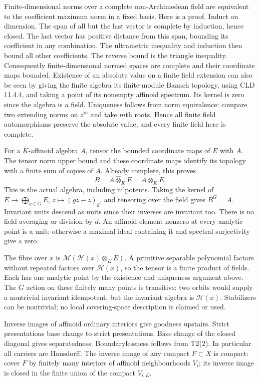 \documentclass[
  10pt,
]{article}
\begin{document}
Finite-dimensional norms over a complete non-Archimedean field are
equivalent to the coefficient maximum norm in a fixed basis. Here is a
proof. Induct on dimension. The span of all but the last vector is
complete by induction, hence closed. The last vector has positive
distance from this span, bounding its coefficient in any combination.
The ultrametric inequality and induction then bound all other
coefficients. The reverse bound is the triangle inequality. Consequently
finite-dimensional normed spaces are complete and their coordinate maps
bounded. Existence of an absolute value on a finite field extension can
also be seen by giving the finite algebra its finite-module Banach
topology, using CLD 11.4.4, and taking a point of its nonempty affinoid
spectrum. Its kernel is zero since the algebra is a field. Uniqueness
follows from norm equivalence: compare two extending norms on \(z^m\)
and take \(m\)th roots. Hence all finite field automorphisms preserve
the absolute value, and every finite field here is complete.

For a \(K\)-affinoid algebra \(A\), tensor the bounded coordinate maps
of \(E\) with \(A\). The tensor norm upper bound and these coordinate
maps identify its topology with a finite sum of copies of \(A\). Already
complete, this proves \[
             B=A\widehat\otimes_K E=A\otimes_K E.        \tag{5}
\] This is the actual algebra, including nilpotents. Taking the kernel
of \(E\to\bigoplus_{g\in G}E\), \(z\mapsto(gz-z)_g\), and tensoring over
the field gives \(B^G=A\). Invariant units descend as units since their
inverses are invariant too. There is no field averaging or division by
\(d\). An affinoid element nonzero at every analytic point is a unit:
otherwise a maximal ideal containing it and spectral surjectivity give a
zero.

The fibre over \(x\) is \(\mathcal M(\mathcal H(x)\otimes_K E)\). A
primitive separable polynomial factors without repeated factors over
\(\mathcal H(x)\), so the tensor is a finite product of fields. Each has
one analytic point by the existence and uniqueness argument above. The
\(G\) action on these finitely many points is transitive: two orbits
would supply a nontrivial invariant idempotent, but the invariant
algebra is \(\mathcal H(x)\). Stabilizers can be nontrivial; no local
covering-space description is claimed or used.

Inverse images of affinoid ordinary interiors give goodness upstairs.
Strict presentations base change to strict presentations. Base change of
the closed diagonal gives separatedness. Boundarylessness follows from
T2(2). In particular all carriers are Hausdorff. The inverse image of
any compact \(F\subset X\) is compact: cover \(F\) by finitely many
interiors of affinoid neighbourhoods \(V_i\); its inverse image is
closed in the finite union of the compact \(V_{i,E}\).
\end{document}

